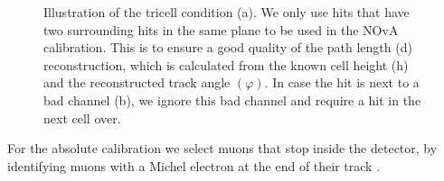 \documentclass[12pt,a4paper]{article}
\begin{document}
\begin{figure}[hbtp]
\begin{subfigure}[b]{0.49\textwidth}
\caption{}
\end{subfigure}
\caption{Illustration of the tricell condition (a). We only use hits that have two surrounding hits in the same plane to be used in the NOvA calibration. This is to ensure a good quality of the path length (d) reconstruction, which is calculated from the known cell height (h) and the reconstructed track angle $\left(\varphi\right)$. In case the hit is next to a bad channel (b), we ignore this bad channel and require a hit in the next cell over.}
\label{figTricellCondition}
\end{figure}




For the absolute calibration we select muons that stop inside the detector, by identifying muons with a Michel electron at the end of their track \cite{NOVA-doc-13579-FACalorimetricEnergyScale}.
\end{document}
